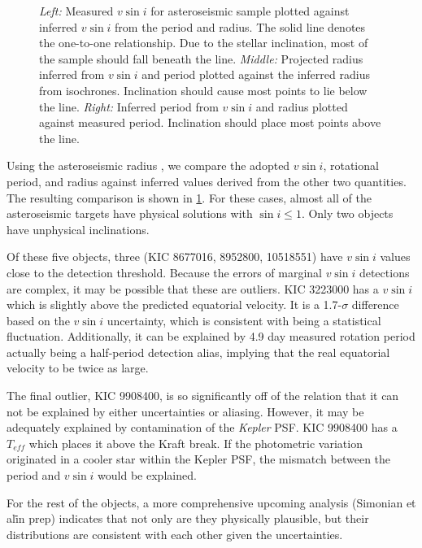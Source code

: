 \documentclass[manuscript]{aastex6}
\newcommand{\vsini}{\ensuremath{v \sin i}}
\newcommand{\Kepler}{\mbox{\textit{Kepler}}}
\newcommand{\Teff}{\ensuremath{T_{eff}}}
\begin{document}
\begin{figure}
    \caption{\emph{Left:} Measured \vsini{} for asteroseismic sample plotted
        against inferred \vsini{} from the period and radius. The solid line 
        denotes the one-to-one relationship. Due to the stellar inclination, most
        of the sample should fall beneath the line. \emph{Middle:} Projected
        radius inferred from \vsini{} and period plotted against the inferred
        radius from isochrones. Inclination should cause most points to lie
        below the line. \emph{Right:} Inferred period from \vsini{} and radius
        plotted against measured period. Inclination should place most points
    above the line.\label{fig:astero_rot}}
\end{figure}

Using the asteroseismic radius \citep{Serenelli17}, we compare the adopted
\vsini{}, rotational period, and radius against inferred values derived from
the other two quantities. The resulting comparison is shown in
\cref{fig:astero_rot}. For these cases, almost all of the asteroseismic 
targets have physical solutions with \(\sin i \le 1\). Only two objects have
unphysical inclinations.

Of these five objects, three (KIC 8677016, 8952800, 10518551) have
\vsini{} values close to the detection threshold. Because the errors of 
marginal \vsini{} detections are complex, 
it may be possible that these are outliers. KIC 3223000 has a
\vsini{} which is slightly above the predicted equatorial velocity. It
is a 1.7-\(\sigma\) difference based on the \vsini{} uncertainty, which
is consistent with being a statistical fluctuation. Additionally, it can
be explained by 4.9 day measured rotation period actually being a 
half-period detection alias, implying that the real equatorial velocity to be twice 
as large. 

The final outlier, KIC 9908400, is so significantly off of the relation
that it can not be explained by either uncertainties or aliasing. However,
it may be adequately explained by contamination of the \Kepler{} PSF\@.
KIC 9908400 has a \Teff{} which places it above the Kraft break. If the 
photometric variation originated in a cooler star within 
the Kepler PSF, the mismatch between the period and \vsini{} would
be explained.

For the rest of the objects, a more comprehensive upcoming analysis 
(Simonian et al\. in prep) indicates that not only are they physically 
plausible, but their distributions are consistent with each other given the 
uncertainties.
\end{document}
